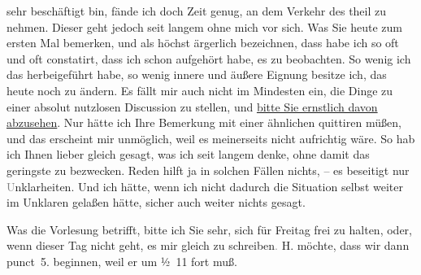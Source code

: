               sehr beschäftigt bin, fände ich doch Zeit genug, an dem Verkehr des \label{K_L03347-2v}\label{K_L03347-2} theil zu
               nehmen. Dieser geht jedoch seit langem ohne mich vor sich. Was Sie heute zum ersten Mal bemerken, und als höchst ärgerlich
               bezeichnen, dass habe ich so oft und oft constatirt, dass ich schon aufgehört habe,
               es zu beobachten. So wenig ich das herbeigeführt habe, so wenig innere und äußere
               Eignung besitze ich, das heute noch zu ändern. Es fällt mir auch nicht im Mindesten
               ein, die Dinge zu einer absolut nutzlosen Discussion zu stellen, und \uline{bitte Sie ernstlich davon abzusehen}. Nur hätte ich
               Ihre Bemerkung mit einer ähnlichen quittiren müßen, und das erscheint mir unmöglich,
               weil es meinerseits nicht aufrichtig wäre. So hab ich Ihnen lieber gleich gesagt, was
               ich seit langem denke, ohne damit das geringste zu bezwecken. Reden hilft ja in
               solchen Fällen nichts, – es beseitigt nur \textcolor{gray}{U}nklarheiten. Und ich
               hätte, wenn ich nicht dadurch die Situation selbst weiter im Unklaren gelaßen hätte,
               sicher auch weiter nichts gesagt.\pend
           
\pstart
           {\pb}Was die Vorlesung betrifft,
               bitte ich Sie sehr, sich für Freitag frei zu halten,
               oder, wenn dieser Tag nicht geht, es mir gleich zu schreiben\textcolor{gray}{.}{ }H. möchte, dass wir dann punct 5.
               beginnen, weil er um ½ 11 fort muß.\pend
           
